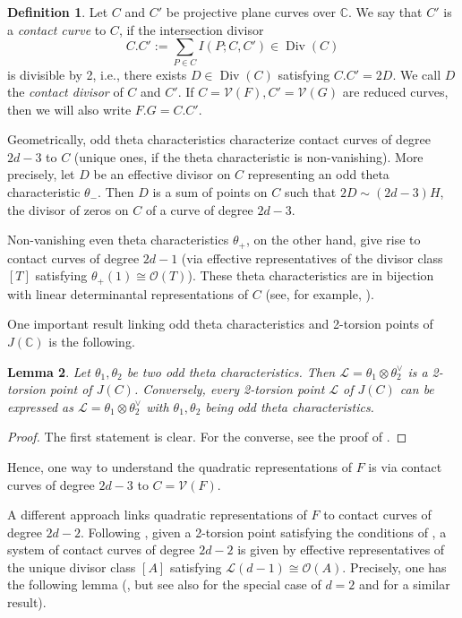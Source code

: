 \documentclass[a4paper,10pt]{amsart}
\theoremstyle{definition}
\newtheorem{Def}{Definition}[section]
\theoremstyle{plain}
\newtheorem{lem}[Def]{Lemma}
\newcommand{\Div}{\operatorname{Div}}
\newcommand{\cL}{{\mathcal L}}
\newcommand{\cO}{{\mathcal O}}
\newcommand{\cV}{{\mathcal V}}
\newcommand{\C}{{\mathbb C}}
\begin{document}
\begin{Def}
    Let $C$ and $C'$ be projective plane curves over $\C$. We say that $C'$ is a \emph{contact curve} to $C$, if the intersection divisor
    \begin{equation*}
        C.C' := \sum_{P \in C} I(P; C,C') \in \Div(C)
    \end{equation*}
    is divisible by 2, i.e., there exists $D \in \Div(C)$ satisfying $C.C' = 2D$. We call $D$ the \emph{contact divisor} of $C$ and $C'$. If $C = \cV(F), C' = \cV(G)$ are reduced curves, then we will also write $F.G = C.C'$.
\end{Def}

Geometrically, odd theta characteristics characterize contact curves of degree $2d-3$ to $C$ (unique ones, if the theta characteristic is non-vanishing). More precisely, let $D$ be an effective divisor on $C$ representing an odd theta characteristic $\theta_-$. Then $D$ is a sum of points on $C$ such that $2D \sim (2d-3)H$, the divisor of zeros on $C$ of a curve of degree $2d-3$.

Non-vanishing even theta characteristics $\theta_+$, on the other hand, give rise to contact curves of degree $2d-1$ (via effective representatives of the divisor class $[T]$ satisfying $\theta_+(1) \cong \cO(T)$). These theta characteristics are in bijection with linear determinantal representations of $C$ (see, for example, \cite[Theorem 2, Theorem 4, Theorem 5]{Vinnikov1989LDR}).

One important result linking odd theta characteristics and 2-torsion points of $J(\C)$ is the following.

\begin{lem} \label{lem:2tor=DiffOddTheta}
    Let $\theta_1, \theta_2$ be two odd theta characteristics. Then $\cL = \theta_1 \otimes \theta_2^\vee$ is a 2-torsion point of $J(C)$. Conversely, every 2-torsion point $\cL$ of $J(C)$ can be expressed as $\cL = \theta_1 \otimes \theta_2^\vee$ with $\theta_1, \theta_2$ being odd theta characteristics.
\end{lem}

\begin{proof}
    The first statement is clear. For the converse, see the proof of \cite[Proposition 5.4.5]{dolgachev}.
\end{proof}

Hence, one way to understand the quadratic representations of $F$ is via contact curves of degree $2d-3$ to $C = \cV(F)$.

A different approach links quadratic representations of $F$ to contact curves of degree $2d-2$. Following \cite[\S 6.2]{dolgachev}, given a 2-torsion point satisfying the conditions of , a system of contact curves of degree $2d-2$ is given by effective representatives of the unique divisor class $[A]$ satisfying $\cL(d-1) \cong \cO(A)$. Precisely, one has the following lemma (\cite[p.~236--237]{dolgachev}, but see also \cite[Proposition 5.7]{plaumann} for the special case of $d =2$ and \cite[Proposition 3.2]{hvelemt} for a similar result).
\end{document}
